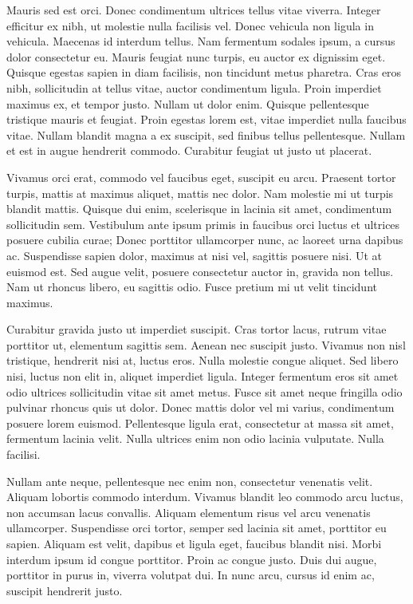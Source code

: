 \documentclass{homework}
\begin{document}
Mauris sed est orci. Donec condimentum ultrices tellus vitae viverra. Integer efficitur ex nibh, ut molestie nulla facilisis vel. Donec vehicula non ligula in vehicula. Maecenas id interdum tellus. Nam fermentum sodales ipsum, a cursus dolor consectetur eu. Mauris feugiat nunc turpis, eu auctor ex dignissim eget. Quisque egestas sapien in diam facilisis, non tincidunt metus pharetra. Cras eros nibh, sollicitudin at tellus vitae, auctor condimentum ligula. Proin imperdiet maximus ex, et tempor justo. Nullam ut dolor enim. Quisque pellentesque tristique mauris et feugiat. Proin egestas lorem est, vitae imperdiet nulla faucibus vitae. Nullam blandit magna a ex suscipit, sed finibus tellus pellentesque. Nullam et est in augue hendrerit commodo. Curabitur feugiat ut justo ut placerat.

Vivamus orci erat, commodo vel faucibus eget, suscipit eu arcu. Praesent tortor turpis, mattis at maximus aliquet, mattis nec dolor. Nam molestie mi ut turpis blandit mattis. Quisque dui enim, scelerisque in lacinia sit amet, condimentum sollicitudin sem. Vestibulum ante ipsum primis in faucibus orci luctus et ultrices posuere cubilia curae; Donec porttitor ullamcorper nunc, ac laoreet urna dapibus ac. Suspendisse sapien dolor, maximus at nisi vel, sagittis posuere nisi. Ut at euismod est. Sed augue velit, posuere consectetur auctor in, gravida non tellus. Nam ut rhoncus libero, eu sagittis odio. Fusce pretium mi ut velit tincidunt maximus.

Curabitur gravida justo ut imperdiet suscipit. Cras tortor lacus, rutrum vitae porttitor ut, elementum sagittis sem. Aenean nec suscipit justo. Vivamus non nisl tristique, hendrerit nisi at, luctus eros. Nulla molestie congue aliquet. Sed libero nisi, luctus non elit in, aliquet imperdiet ligula. Integer fermentum eros sit amet odio ultrices sollicitudin vitae sit amet metus. Fusce sit amet neque fringilla odio pulvinar rhoncus quis ut dolor. Donec mattis dolor vel mi varius, condimentum posuere lorem euismod. Pellentesque ligula erat, consectetur at massa sit amet, fermentum lacinia velit. Nulla ultrices enim non odio lacinia vulputate. Nulla facilisi.

Nullam ante neque, pellentesque nec enim non, consectetur venenatis velit. Aliquam lobortis commodo interdum. Vivamus blandit leo commodo arcu luctus, non accumsan lacus convallis. Aliquam elementum risus vel arcu venenatis ullamcorper. Suspendisse orci tortor, semper sed lacinia sit amet, porttitor eu sapien. Aliquam est velit, dapibus et ligula eget, faucibus blandit nisi. Morbi interdum ipsum id congue porttitor. Proin ac congue justo. Duis dui augue, porttitor in purus in, viverra volutpat dui. In nunc arcu, cursus id enim ac, suscipit hendrerit justo.
\end{document}
